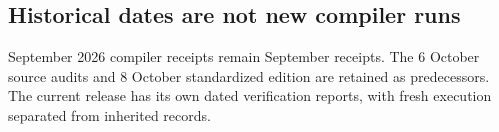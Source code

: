 \subsection*{Historical dates are not new compiler runs}
September 2026 compiler receipts remain September receipts. The 6 October source audits and 8 October standardized edition are retained as predecessors. The current release has its own dated verification reports, with fresh execution separated from inherited records.
\clearpage
